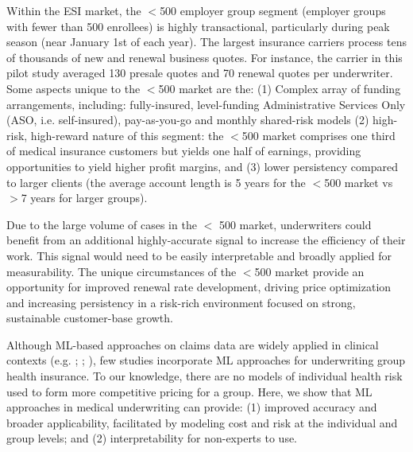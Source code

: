 \documentclass[letterpaper]{article} %
\begin{document}
Within the ESI market, the $<$500 employer group segment (employer groups with fewer than 500 enrollees) is highly transactional, particularly during peak season (near January 1st of each year). The largest insurance carriers process tens of thousands of new  and renewal business quotes.  For instance, the carrier in this pilot study averaged 130 presale quotes and 70 renewal quotes per underwriter.  Some aspects unique to the $<$500 market are the: 
(1) Complex array of funding arrangements, including: fully-insured, level-funding Administrative Services Only (ASO, i.e. self-insured), pay-as-you-go and monthly shared-risk models \cite{GrowEmpInt}
(2) high-risk, high-reward nature of this segment:  the $<$500 market comprises one third of medical insurance customers but yields one half of earnings, providing opportunities to yield higher profit margins, and
(3) lower persistency compared to larger clients (the average account length is 5 years for the $<$500 market vs $>$7 years for larger groups).


Due to the large volume of cases in the $<$ 500 market, underwriters could benefit from an additional highly-accurate signal to increase the efficiency of their work.  This signal would need to be easily interpretable and broadly applied for measurability. The unique circumstances of the $<$500 market provide an opportunity for improved renewal rate development, driving price optimization and increasing persistency in a risk-rich environment focused on strong, sustainable customer-base growth.

Although ML-based approaches on claims data are widely applied in clinical contexts (e.g. \citeauthor{DM2} \citeyear{DM2}; \citeauthor{CostBloom} \citeyear{CostBloom}; \citeauthor{scalable} \citeyear{scalable}), few studies incorporate ML approaches for underwriting group health insurance.  To our knowledge, there are no models of individual health risk used to form more competitive pricing for a group. Here, we show that ML approaches in medical underwriting can provide: (1)  improved accuracy and broader applicability, facilitated by modeling cost and risk at the individual and group levels; and (2) interpretability for non-experts to use.  

\end{document}
